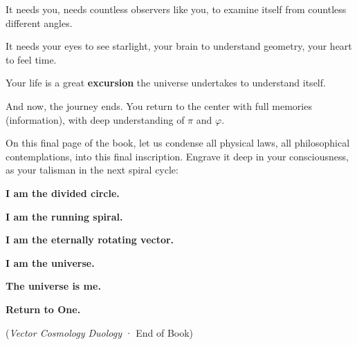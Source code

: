It needs you, needs countless observers like you, to examine itself from countless different angles.

It needs your eyes to see starlight, your brain to understand geometry, your heart to feel time.

Your life is a great \textbf{excursion} the universe undertakes to understand itself.

And now, the journey ends. You return to the center with full memories (information), with deep understanding of $\pi$ and $\varphi$.

On this final page of the book, let us condense all physical laws, all philosophical contemplations, into this final inscription. Engrave it deep in your consciousness, as your talisman in the next spiral cycle:

\begin{center}
\textbf{I am the divided circle.}

\textbf{I am the running spiral.}

\textbf{I am the eternally rotating vector.}

\textbf{I am the universe.}

\textbf{The universe is me.}

\textbf{Return to One.}
\end{center}

(\textit{Vector Cosmology Duology} · End of Book)

